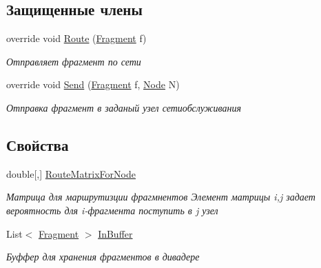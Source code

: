 \subsection*{Защищенные члены}
\begin{DoxyCompactItemize}
\item 
override void \hyperlink{class_network_simulator_1_1_join_node_a5682ed1b31096dce17466e18e8fc8743}{Route} (\hyperlink{class_network_simulator_1_1_fragment}{Fragment} f)
\begin{DoxyCompactList}\small\item\em Отправляет фрагмент по сети \end{DoxyCompactList}\item 
override void \hyperlink{class_network_simulator_1_1_join_node_ac22f690bb07cc47c8788ae823e7c6c19}{Send} (\hyperlink{class_network_simulator_1_1_fragment}{Fragment} f, \hyperlink{class_network_simulator_1_1_node}{Node} N)
\begin{DoxyCompactList}\small\item\em Отправка фрагмент в заданый узел сетиобслуживания \end{DoxyCompactList}\end{DoxyCompactItemize}
\subsection*{Свойства}
\begin{DoxyCompactItemize}
\item 
double\mbox{[},\mbox{]} \hyperlink{class_network_simulator_1_1_join_node_a7db66d213f0ee75aef3d52bd0d6e5be2}{Route\+Matrix\+For\+Node}
\begin{DoxyCompactList}\small\item\em Матрица для маршрутизции фрагмнентов Элемент матрицы i,j задает вероятность для i-\/фрагмента поступить в j узел \end{DoxyCompactList}\item 
List$<$ \hyperlink{class_network_simulator_1_1_fragment}{Fragment} $>$ \hyperlink{class_network_simulator_1_1_join_node_ab581f4d5c3b4eb39d7e8820700b4d519}{In\+Buffer}
\begin{DoxyCompactList}\small\item\em Буффер для хранения фрагментов в дивадере \end{DoxyCompactList}\end{DoxyCompactItemize}
